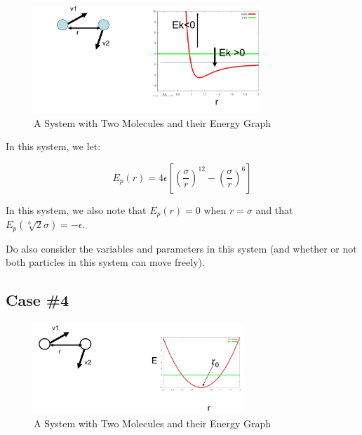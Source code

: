 \documentclass[
  letterpaper,
  DIV=11,
  numbers=noendperiod]{scrreprt}
\begin{document}
\begin{figure}

{\centering \includegraphics[width=3.36in,height=\textheight]{./images/wk1/sys3.jpg}

}

\caption{A System with Two Molecules and their Energy Graph}

\end{figure}

In this system, we let:

\begin{equation}
  E_p(r) = 4\epsilon\left[\left(\frac{\sigma}{r}\right)^{12} - \left(\frac{\sigma}{r}\right)^6\right]
\end{equation}

In this system, we also note that \(E_p(r) = 0\) when \(r = \sigma\) and
that \(\displaystyle E_p(\sqrt[6]{2}\sigma) = -\epsilon\).

Do also consider the variables and parameters in this system (and
whether or not both particles in this system can move freely).

\hypertarget{case-4}{%
\subsection{Case \#4}\label{case-4}}

\begin{figure}

{\centering \includegraphics[width=3.13in,height=\textheight]{./images/wk1/sys4.jpg}

}

\caption{A System with Two Molecules and their Energy Graph}

\end{figure}
\end{document}

